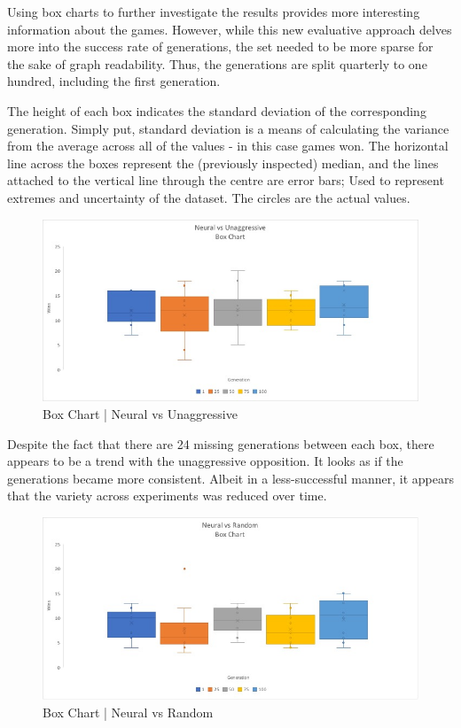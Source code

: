 \documentclass[12pt,a4paper]{article}
\begin{document}
Using box charts to further investigate the results provides more interesting information about the games. However, while this new evaluative approach delves more into the success rate of generations, the set needed to be more sparse for the sake of graph readability. Thus, the generations are split quarterly to one hundred, including the first generation. 

The height of each box indicates the standard deviation of the corresponding generation. Simply put, standard deviation is a means of calculating the variance from the average across all of the values - in this case games won. The horizontal line across the boxes represent the (previously inspected) median, and the lines attached to the vertical line through the centre are error bars; Used to represent extremes and uncertainty of the dataset. The circles are the actual values.

\newpage
\begin{figure}[h]
	\centering
	\includegraphics[width = \textwidth]{BoxUna.jpg}
	\caption{Box Chart | Neural vs Unaggressive}
\end{figure}

Despite the fact that there are 24 missing generations between each box, there appears to be a trend with the unaggressive opposition. It looks as if the generations became more consistent. Albeit in a less-successful manner, it appears that the variety across experiments was reduced over time. 

\begin{figure}[h]
	\centering
	\includegraphics[width = \textwidth]{BoxRand.jpg}
	\caption{Box Chart | Neural vs Random}
\end{figure}
\end{document}
